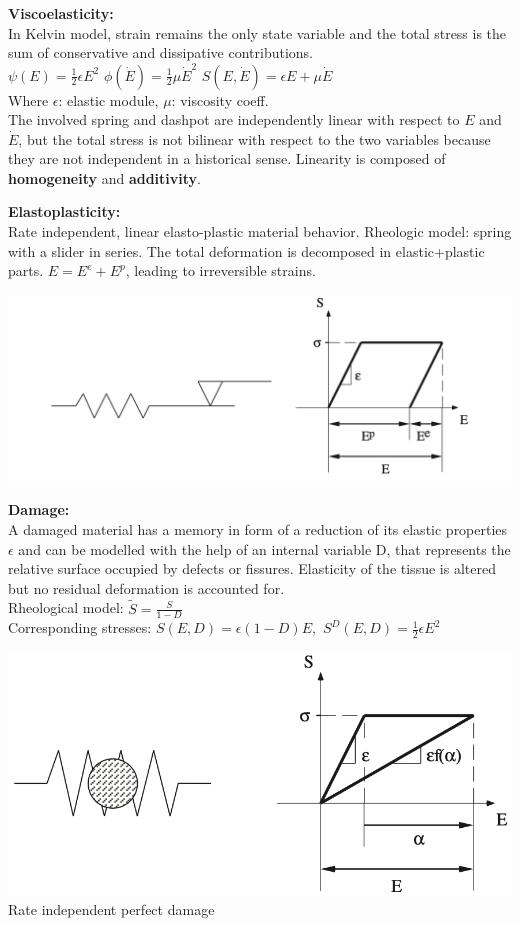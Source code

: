 \textbf{Viscoelasticity:} \\
In Kelvin model, strain remains the only state variable and the total stress is the sum of conservative and dissipative contributions. \\
$\psi (E) = \frac{1}{2} \epsilon E^2$ \qquad $\phi (\dot{E}) =  \frac{1}{2} \mu \dot{E}^2 $ \quad $S(E,\dot{E}) = \epsilon E + \mu \dot{E} $ \\
Where $\epsilon$: elastic module, $\mu$: viscosity coeff. \\

The involved spring and dashpot are independently linear with respect to $E$ and $\dot{E}$, but the total stress is not bilinear with respect to the two variables because they are not independent in a historical sense. Linearity is composed of \textbf{homogeneity} and \textbf{additivity}.

\textbf{Elastoplasticity:} \\
Rate independent, linear elasto-plastic material behavior. Rheologic model: spring with a slider in series. The total deformation is decomposed in elastic+plastic parts.
$E = E^e + E^p$, leading to irreversible strains.

\begin{center}
\includegraphics[width=0.5\linewidth]{img/ElastoPlast} \\
\end{center}

\textbf{Damage:} \\
A damaged material has a memory in form of a reduction of its elastic properties $\epsilon$ and can be modelled with the help of an internal variable D, that represents the relative surface occupied by defects or fissures. Elasticity of the tissue is altered but no residual deformation is accounted for. \\
Rheological model: $\tilde{S} = \frac{S}{1-D}$ \\
Corresponding stresses: $S (E,D) = \epsilon (1-D) E,$ \qquad $S^D (E,D) = \frac{1}{2} \epsilon E^2$

\begin{center}
\includegraphics[width=0.5\linewidth]{img/Damage} \\
Rate independent perfect damage
\end{center}